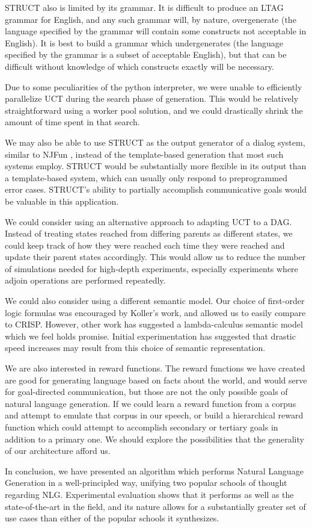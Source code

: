 STRUCT also is limited by its grammar.  It is difficult to produce an LTAG grammar
for English, and any such grammar will, by nature, overgenerate (the language
specified by the grammar will contain some constructs not acceptable in
English).  It is best to build a grammar which undergenerates (the language
specified by the grammar is a subset of acceptable English), but that can
be difficult without knowledge of which constructs exactly will be necessary.

Due to some peculiarities of the python interpreter, we were unable to
efficiently parallelize UCT during the search phase of generation.  This
would be relatively straightforward using a worker pool solution, and we
could drastically shrink the amount of time spent in that search.

We may also be able to use STRUCT as the output generator of a dialog system,
similar to NJFun \cite{litman_njfun_2000}, instead of the template-based generation
that most such systems employ.  STRUCT would be substantially more flexible in
its output than a template-based system, which can usually only respond to preprogrammed
error cases.  STRUCT's ability to partially accomplish communicative goals would be
valuable in this application.

We could consider using an alternative approach to adapting UCT to a DAG.  Instead
of treating states reached from differing parents as different states, we could keep
track of how they were reached each time they were reached and update their parent
states accordingly.  This would allow us to reduce the number of simulations needed
for high-depth experiments, especially experiments where adjoin operations are
performed repeatedly.

We could also consider using a different semantic model.  Our choice of first-order logic
formulas was encouraged by Koller's work, and allowed us to easily compare to CRISP.
However, other work has suggested a lambda-calculus semantic model \cite{wong2007learning}
which we feel holds promise.  Initial experimentation has suggested that drastic speed increases
may result from this choice of semantic representation.

We are also interested in reward functions.  The reward functions we have created
are good for generating language based on facts about the world, and would
serve for goal-directed communication, but those are not the only possible
goals of natural language generation.  If we could learn a reward function from
a corpus and attempt to emulate that corpus in our speech, or build a hierarchical
reward function which could attempt to accomplish secondary or tertiary goals
in addition to a primary one.  We should explore the possibilities that the
generality of our architecture afford us.

In conclusion, we have presented an algorithm which performs Natural Language
Generation in a well-principled way, unifying two popular schools of thought regarding
NLG.  Experimental evaluation shows that it performs as well as the state-of-the-art in
the field, and its nature allows for a substantially greater set of use cases than either
of the popular schools it synthesizes.